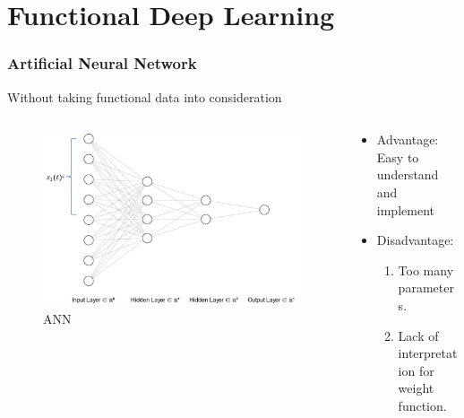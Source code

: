 \documentclass[
	9pt, %
]{beamer}
\begin{document}
\section{Functional Deep Learning}
\begin{frame}
	\frametitle{Artificial Neural Network}
	Without taking functional data into consideration
	\begin{columns}[t]
		\begin{column}{0.5\textwidth}
			\begin{figure}
				\includegraphics[width=0.9\linewidth]{fnn1.jpg}
				\caption{ANN}
			\end{figure}
		\end{column}
		\begin{column}{0.5\textwidth}
			\begin{itemize}
			\item Advantage:\\
			Easy to understand and implement
			\bigskip
			\item Disadvantage:\\
			\begin{enumerate}
			\item Too many parameters.
			\smallskip
			\item Lack of interpretation for weight function.
			\end{enumerate}		
			\end{itemize}
		\end{column}
	\end{columns}
\end{frame}
\end{document}
